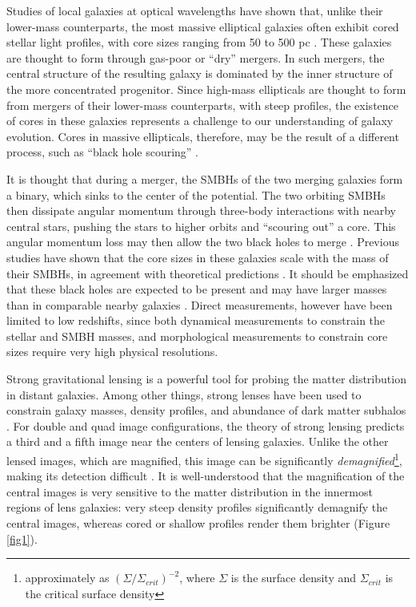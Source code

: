 \documentclass[chicago]{emulateapj}
\begin{document}
Studies of local galaxies at optical wavelengths have shown that, unlike their lower-mass counterparts, the most massive elliptical galaxies often exhibit cored stellar light profiles, with core sizes ranging from 50 to 500 pc \citep[e.g.,][]{Ferrarese:06}. 
These galaxies are thought to form through gas-poor or ``dry'' mergers. In such mergers, the central structure of the resulting galaxy is dominated by the inner structure of the more concentrated progenitor.  Since high-mass ellipticals are thought to form from mergers of their lower-mass counterparts, with steep profiles, the existence of cores in these galaxies represents a challenge to our understanding of galaxy evolution. Cores in massive ellipticals, therefore, may be the result of a different process, such as  
``black hole scouring'' \citep{Thomas:14}.

It is thought that during a merger, the SMBHs of the two merging galaxies form a binary, which sinks to the center of the potential. The two orbiting SMBHs then dissipate angular momentum through three-body interactions with nearby central stars, pushing the stars to higher orbits and ``scouring out'' a core. This angular momentum loss may then allow the two black holes to merge \citep{Begelman:80}.
Previous studies have shown that the core sizes in these galaxies scale with the mass of their SMBHs, in agreement with theoretical predictions \citep{Kormendy:09,Kormendy:13}. It should be emphasized that these black holes are expected to be present and may have larger masses than in comparable nearby galaxies \citep{Bennert:10}. Direct measurements, however have been limited to low redshifts, since both dynamical measurements to constrain the stellar and SMBH masses, and morphological measurements to constrain core sizes require very high physical resolutions. 


Strong gravitational lensing is a powerful tool for probing the matter distribution in distant galaxies. Among other things, strong lenses have been used to constrain galaxy masses, density profiles, and abundance of dark matter subhalos \citep[e.g.,][]{dalal:02, Gavazzi:07, Bolton:08}. For double and quad image configurations, the theory of strong lensing predicts a third and a fifth image near the centers of lensing galaxies. Unlike the other lensed images, which are magnified, this image can be significantly \emph{demagnified}\footnote{approximately as $(\Sigma/\Sigma_{crit})^{-2}$, where $\Sigma$ is the surface density and $\Sigma_{crit}$ is the critical surface density}, making its detection difficult \citep[e.g.,][]{Jackson:13}.  It is well-understood that the magnification of the central images is very sensitive to the matter distribution in the innermost regions of lens galaxies: very steep density profiles significantly demagnify the central images, whereas cored or shallow profiles render them brighter (Figure \ref{fig1}). 
\end{document}
